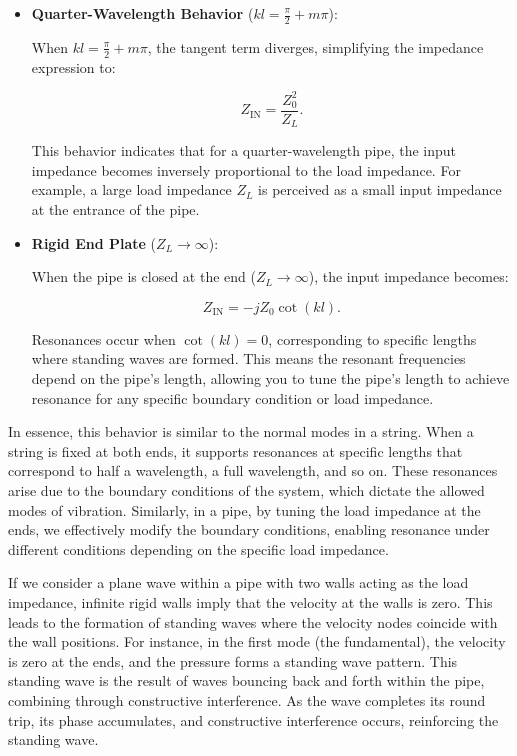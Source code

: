\documentclass[a4paper]{article}
\begin{document}
\begin{itemize}
    \item  \textbf{Quarter-Wavelength Behavior} (\( kl = \frac{\pi}{2} + m\pi \)):

   When \( kl = \frac{\pi}{2} + m\pi \), the tangent term diverges, simplifying the impedance expression to:

   \[
   Z_\text{IN} = \frac{Z_0^2}{Z_L}.
   \]

   This behavior indicates that for a quarter-wavelength pipe, the input impedance becomes inversely proportional to the load impedance. For example, a large load impedance \( Z_L \) is perceived as a small input impedance at the entrance of the pipe.

\item \textbf{Rigid End Plate} (\( Z_L \to \infty \)):

   When the pipe is closed at the end (\( Z_L \to \infty \)), the input impedance becomes:

   \[
   Z_\text{IN} = -j Z_0 \cot(kl).
   \]

 Resonances occur when \( \cot(kl) = 0 \), corresponding to specific lengths where standing waves are formed. This means the resonant frequencies depend on the pipe's length, allowing you to tune the pipe's length to achieve resonance for any specific boundary condition or load impedance.

\end{itemize}

In essence, this behavior is similar to the normal modes in a string. When a string is fixed at both ends, it supports resonances at specific lengths that correspond to half a wavelength, a full wavelength, and so on. These resonances arise due to the boundary conditions of the system, which dictate the allowed modes of vibration. Similarly, in a pipe, by tuning the load impedance at the ends, we effectively modify the boundary conditions, enabling resonance under different conditions depending on the specific load impedance.

If we consider a plane wave within a pipe with two walls acting as the load impedance, infinite rigid walls imply that the velocity at the walls is zero. This leads to the formation of standing waves where the velocity nodes coincide with the wall positions. For instance, in the first mode (the fundamental), the velocity is zero at the ends, and the pressure forms a standing wave pattern. This standing wave is the result of waves bouncing back and forth within the pipe, combining through constructive interference. As the wave completes its round trip, its phase accumulates, and constructive interference occurs, reinforcing the standing wave.
\end{document}
